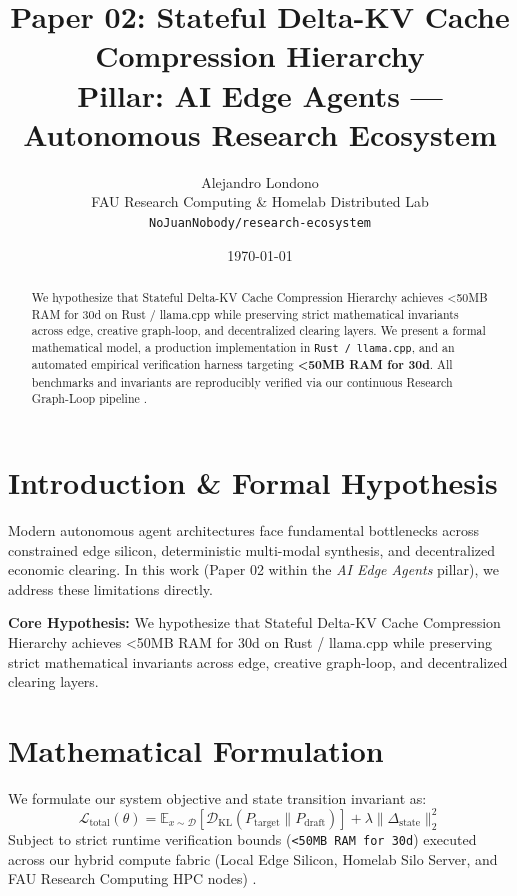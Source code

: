 \documentclass[10pt,twocolumn]{article}
\title{\textbf{Paper 02: Stateful Delta-KV Cache Compression Hierarchy}\\
\large Pillar: AI Edge Agents --- Autonomous Research Ecosystem}
\author{
  Alejandro Londono \\
  FAU Research Computing \& Homelab Distributed Lab \\
  \texttt{NoJuanNobody/research-ecosystem}
}
\date{\today}
\begin{document}
\maketitle

\begin{abstract}
We hypothesize that Stateful Delta-KV Cache Compression Hierarchy achieves <50MB RAM for 30d on Rust / llama.cpp while preserving strict mathematical invariants across edge, creative graph-loop, and decentralized clearing layers.
We present a formal mathematical model, a production implementation in \texttt{Rust / llama.cpp}, and an automated empirical verification harness targeting \textbf{<50MB RAM for 30d}. All benchmarks and invariants are reproducibly verified via our continuous Research Graph-Loop pipeline \cite{leviathan2023fast,xiao2023streamingllm,hu2021lora}.
\end{abstract}

\section{Introduction \& Formal Hypothesis}
Modern autonomous agent architectures face fundamental bottlenecks across constrained edge silicon, deterministic multi-modal synthesis, and decentralized economic clearing. In this work (Paper 02 within the \textit{AI Edge Agents} pillar), we address these limitations directly.

\textbf{Core Hypothesis:} We hypothesize that Stateful Delta-KV Cache Compression Hierarchy achieves <50MB RAM for 30d on Rust / llama.cpp while preserving strict mathematical invariants across edge, creative graph-loop, and decentralized clearing layers.

\section{Mathematical Formulation}
We formulate our system objective and state transition invariant as:
\begin{equation}
\mathcal{L}_{\text{total}}(\theta) = \mathbb{E}_{x \sim \mathcal{D}}\left[\mathcal{D}_{\text{KL}}(P_{\text{target}} \parallel P_{\text{draft}})\right] + \lambda \|\Delta_{\text{state}}\|_2^2
\end{equation}
Subject to strict runtime verification bounds (\texttt{<50MB RAM for 30d}) executed across our hybrid compute fabric (Local Edge Silicon, Homelab Silo Server, and FAU Research Computing HPC nodes) \cite{rafailov2023dpo,shapley1953value,hanson2003combinatorial}.
\end{document}
